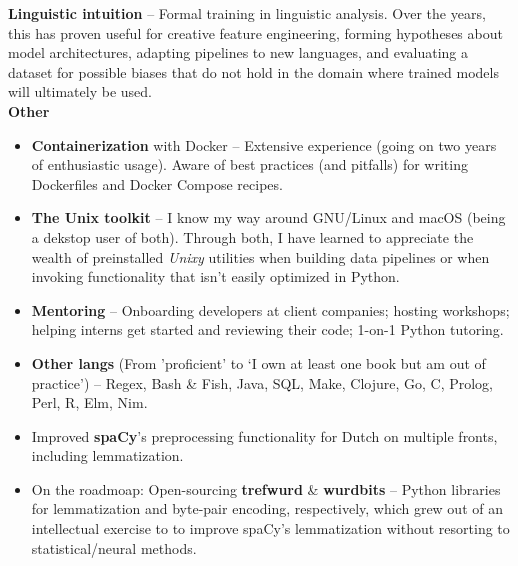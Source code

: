 \documentclass[9pt]{developercv} %
\begin{document}
\textbf{Linguistic intuition} -- Formal training in linguistic analysis. Over
the years, this has proven useful for creative feature engineering, forming
hypotheses about model architectures, adapting pipelines to new languages, and
evaluating a dataset for possible biases that do not hold in the domain where
trained models will ultimately be used.\\

\textbf{Other}
\begin{itemize}[leftmargin=*]
    \setlength\itemsep{-2pt}

\item \textbf{Containerization} with Docker -- Extensive experience (going on
    two years of enthusiastic usage). Aware of best practices (and pitfalls)
    for writing Dockerfiles and Docker Compose recipes. 

\item \textbf{The Unix toolkit} -- I know my way around GNU/Linux and macOS
    (being a dekstop user of both). Through both, I have learned to appreciate
    the wealth of preinstalled \textit{Unixy} utilities when building data
    pipelines or when invoking functionality that isn't easily optimized in
    Python.

\item \textbf{Mentoring} -- Onboarding developers at client companies; hosting
    workshops; helping interns get started and reviewing their code; 1-on-1
    Python tutoring.

\item \textbf{Other langs} (From 'proficient' to `I own at least one book but 
    am out of practice') -- Regex, Bash \& Fish, Java, SQL, Make, Clojure,
    Go, C, Prolog, Perl, R, Elm, Nim.
\end{itemize}

\vspace{-1em}
\begin{itemize}[leftmargin=*]
    \setlength\itemsep{-2pt}
    \item Improved \textbf{spaCy}'s preprocessing functionality for Dutch
        on multiple fronts, including lemmatization.
    \item On the roadmoap: Open-sourcing \textbf{trefwurd} \& \textbf{wurdbits} 
        -- Python libraries for
        lemmatization and byte-pair encoding, respectively, which grew out of
        an intellectual exercise to to improve spaCy's lemmatization without
        resorting to statistical/neural methods.
\end{itemize}


\end{document}
